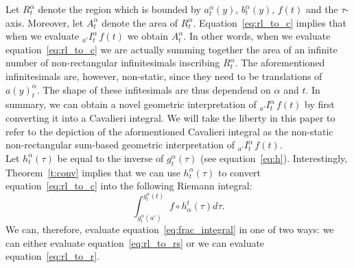 \documentclass[twoside,reqno,11pt]{fcaa-var} %
\begin{document}
\noindent
Let $R_t^{\alpha}$ denote the region which is bounded by $a_t^{\alpha}(y)$, $b_t^{\alpha}(y)$, $f(t)$ and the $\tau$-axis. Moreover, let $A_{t}^{\alpha}$ denote the area of $R_t^{\alpha}$. Equation~\ref{eq:rl_to_c} implies that when we evaluate $_{a'}I_t^{\alpha}\,f(t)$ we obtain $A_{t}^{\alpha}$. In other words, when we evaluate equation~\ref{eq:rl_to_c} we are actually summing together the area of an infinite number of non-rectangular infinitesimals inscribing $R_t^{\alpha}$. The aforementioned infinitesimals are, however, non-static, since they need to be translations of $a(y)_t^{\alpha}$. The shape of these infitesimals are thus dependend on $\alpha$ and $t$. In summary, we can obtain a novel geometric interpretation of 
$_{a'}I_t^{\alpha}\,f(t)$ by first converting it into a Cavalieri integral. We will take the liberty in this paper to refer to the depiction of the aformentioned Cavalieri integral as the non-static non-rectangular sum-based geometric interpretation of $_{a'}I_t^{\alpha}\,f(t)$.\\


\noindent
Let $h_t^{\alpha}(\tau)$ be equal to the inverse of $g_t^{\alpha}(\tau)$ (see equation~\ref{eq:h}). Interestingly, Theorem~\ref{t:conv} implies that we can use $h_t^{\alpha}(\tau)$ to convert equation~\eqref{eq:rl_to_c} into the following Riemann integral:
\begin{equation}
\label{eq:rl_to_r}
\int_{g_t^{\alpha}(a')}^{g_t^{\alpha}(t)} f\circ h_{\alpha}^t (\tau) d\tau.  
\end{equation}
We can, therefore, evaluate equation~\eqref{eq:frac_integral} in one of two ways: we can either evaluate equation~\eqref{eq:rl_to_rs} or we can evaluate equation~\eqref{eq:rl_to_r}.
\end{document}
